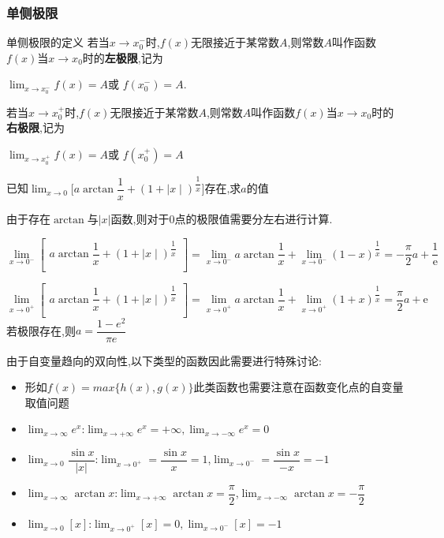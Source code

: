 \documentclass[10pt, a4paper, oneside, UTF8]{ctexbook}
\begin{document}
\begin{sloppypar}
    \subsubsection{单侧极限}
    \begin{defn}{单侧极限的定义}{}
        若当$x\to x_0^{-}$时,$f(x)$无限接近于某常数$A$,则常数$A$叫作函数$f(x)$当$x\to x_0$时的\textbf{左极限},记为
        \begin{center}
            $\operatorname*{lim}_{x\to x_0^{-}}f(x)=A$或 $f(x_0^{-})=A$.
        \end{center}
        若当$x\to x_0^+$时,$f(x)$无限接近于某常数$A$,则常数$A$叫作函数$f(x)$当$x\to x_0$时的\textbf{右极限},记为
        \begin{center}
            $\operatorname*{lim}_{x\to x_0^{+}}f(x)=A$或 $f(x_0^{+})=A$
        \end{center}
    \end{defn}
    \begin{problem}
    $\text{已知}\lim_{x\to0}\biggl[a\arctan\dfrac{1}{x}+(1+\mid x\mid)^{\dfrac{1}{x}}\biggr]\text{存在,求}a\text{的值}$
    \end{problem}
    \begin{solution}
        由于存在$\arctan$与$|x|$函数,则对于0点的极限值需要分左右进行计算.

        $\lim\limits_{x\to0^{-}}\left[\begin{matrix}a\arctan\dfrac{1}{x}+(1+\mid x\mid)^{\dfrac{1}{x}}\\\end{matrix}\right]=\lim\limits_{x\to0^{-}}a\arctan\dfrac{1}{x}+\lim\limits_{x\to0^{-}}(1-x)^{\dfrac{1}{x}}=-\dfrac{\pi}{2}a+\dfrac{1}{\text{e}}$

        $\lim\limits_{x\to0^+}\left[\begin{matrix}a\arctan\dfrac{1}{x}+(1+\mid x\mid)^{\dfrac{1}{x}}\\\end{matrix}\right]=\lim\limits_{x\to0^+}a\arctan\dfrac{1}{x}+\lim\limits_{x\to0^+}(1+x)^{\dfrac{1}{x}}=\dfrac{\pi}{2}a+\mathrm{e}$
        若极限存在,则$a=\dfrac{1-e^2}{\pi e}$
    \end{solution}
    \begin{note}
        由于自变量趋向的双向性,以下类型的函数因此需要进行特殊讨论:
        \begin{itemize}
            \item 形如$f(x)=max\{h(x),g(x)\}$此类函数也需要注意在函数变化点的自变量取值问题
            \item $\lim_{x \to \infty}e^x$:$\lim _{x \to +\infty}e^x=+\infty,
                      \lim _{x \to -\infty}e^x=0$
            \item $\lim_{x \to 0} \dfrac{\sin x}{|x|}$:$\lim_{x \to 0^+}=\dfrac{\sin x}{x}=1$,$\lim_{x \to 0^-}=\dfrac{\sin x}{-x}=-1$
            \item $\lim_{x \to \infty }\arctan x$:$\lim_{x \to +\infty}\arctan x=\dfrac{\pi}{2}$,$\lim_{x \to -\infty}\arctan x= -\dfrac{\pi}{2}$
            \item $\lim_{x \to 0}[x]$:$\lim _{x \to 0^+}[x]=0,\lim_{x \to 0^-}[x]=-1$
        \end{itemize}
    \end{note}

\end{sloppypar}
\end{document}
